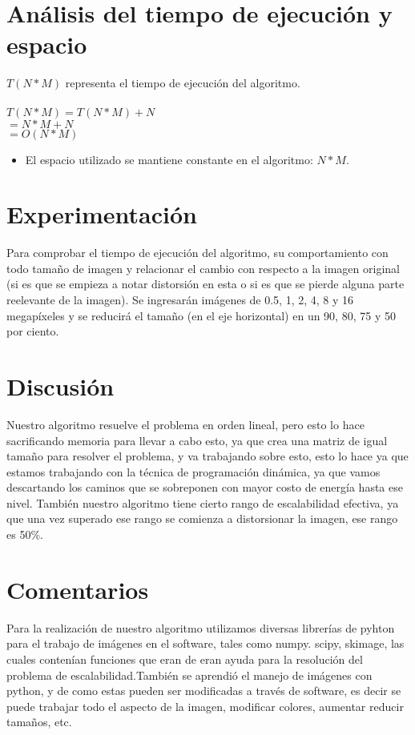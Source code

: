 \documentclass[twocolumn,11pts]{IEEEtran}
\begin{document}
\section{Análisis del tiempo de ejecución y espacio}
$T(N*M)$ representa el tiempo de ejecución del algoritmo.\\\\

$T(N*M)= T(N*M)+N$ \\
$      = N*M+N$\\
$      = O(N*M)$\\

\begin{itemize}
\item El espacio utilizado se mantiene constante en el algoritmo: $N*M$.
\end{itemize} 

\section{Experimentación}
Para comprobar el tiempo de ejecución del algoritmo, su comportamiento con todo tamaño de imagen y relacionar el cambio con respecto a la imagen original (si es que se empieza a notar distorsión en esta o si es que se pierde alguna parte reelevante de la imagen). Se ingresarán imágenes de 0.5, 1, 2, 4, 8 y 16 megapíxeles y se reducirá el tamaño (en el eje horizontal) en un 90, 80, 75 y 50 por ciento.

\section{Discusión}
Nuestro algoritmo resuelve el problema en orden lineal, pero esto lo hace sacrificando memoria para llevar a cabo esto, ya que crea una matriz de igual tamaño para resolver el problema, y va trabajando sobre esto, esto lo hace ya que estamos trabajando con la técnica de programación dinámica, ya que vamos descartando los caminos que se sobreponen con mayor costo de energía hasta ese nivel. También nuestro algoritmo tiene cierto rango de escalabilidad efectiva, ya que una vez superado ese rango se comienza a distorsionar la imagen, ese rango es 50\%.
\section{Comentarios}
Para la realización de nuestro algoritmo utilizamos diversas librerías de pyhton para el trabajo de imágenes en el software, tales como numpy. scipy, skimage, las cuales contenían funciones que eran de eran ayuda para la resolución del problema de escalabilidad.También se aprendió el manejo de imágenes con python, y de como estas pueden ser modificadas a través de software, es decir se puede trabajar todo el aspecto de la imagen, modificar colores, aumentar reducir tamaños, etc.
\end{document}
